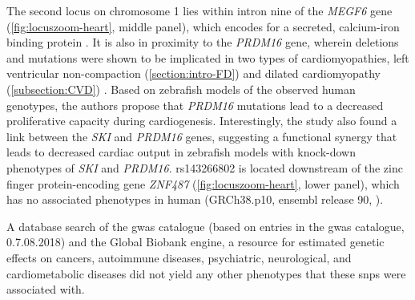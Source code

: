 The second locus on chromosome \num{1} lies within intron nine of the \textit{MEGF6} gene (\cref{fig:locuszoom-heart}, middle panel), which encodes for a secreted, calcium-iron binding protein \citep{Nakayama1998}. It is also in proximity to the \textit{PRDM16} gene, wherein deletions and mutations were shown to be implicated in two types of cardiomyopathies, left ventricular non-compaction (\cref{section:intro-FD}) and dilated cardiomyopathy  (\cref{subsection:CVD}) \citep{Arndt2013}. Based on zebrafish models of the observed human genotypes, the authors propose that \textit{PRDM16} mutations lead to a decreased proliferative capacity during cardiogenesis. Interestingly, the study also found a link between the \textit{SKI} and \textit{PRDM16} genes, suggesting a functional synergy that leads to decreased cardiac output in zebrafish models with knock-down phenotypes of \textit{SKI} and \textit{PRDM16}. rs143266802 is located downstream of the zinc finger protein-encoding gene \textit{ZNF487} (\cref{fig:locuszoom-heart}, lower panel), which has no associated phenotypes in human (GRCh38.p10, ensembl release 90, \citep{Aken2016}).  

A database search of the \gls{gwas} catalogue \citep{MacArthur2017} (based on entries in the \gls{gwas} catalogue, 0.7.08.2018) and the Global Biobank engine, a resource for estimated genetic effects on cancers, autoimmune diseases, psychiatric, neurological, and cardiometabolic diseases \citep{GBE2017} did not yield any other phenotypes that these \glspl{snp} were associated with.



